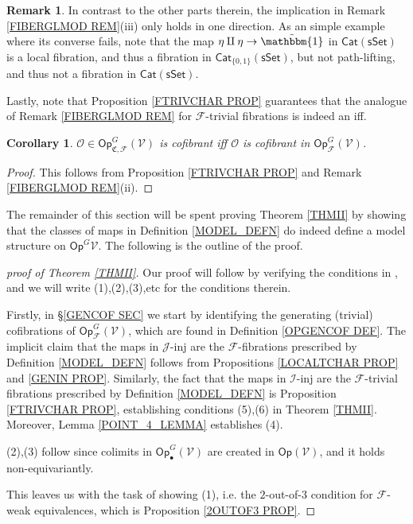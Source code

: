 \documentclass[a4paper,10pt
,draft
]{article}%
\numberwithin{equation}{section}
\numberwithin{figure}{section}
\newtheorem{corollary}[equation]{Corollary}%
\theoremstyle{definition} %
\newtheorem{remark}[equation]{Remark}%
\newcommand{\Op}{\mathsf{Op}}%
\newcommand{\F}{\ensuremath{\mathcal F}}
\newcommand{\V}{\ensuremath{\mathcal V}}
\renewcommand{\O}{\ensuremath{\mathcal O}}
\newcommand{\1}{\ensuremath{\mathbbm 1}}%
\begin{document}
\begin{remark}
In contrast to the other parts therein,
the implication in Remark \ref{FIBERGLMOD REM}(iii) 
only holds in one direction. 
As an simple example where its converse fails, 
note that the map $\eta \amalg \eta \to \tilde{\mathbbm{1}}$
in $\mathsf{Cat}(\mathsf{sSet})$ is a local fibration, 
and thus a fibration in $\mathsf{Cat}_{\{0,1\}}(\mathsf{sSet})$,
but not path-lifting, and thus not a fibration in $\mathsf{Cat}(\mathsf{sSet})$.

Lastly, note that Proposition \ref{FTRIVCHAR PROP}
guarantees that the analogue of Remark \ref{FIBERGLMOD REM}
for $\F$-trivial fibrations is indeed an iff.
\end{remark}

\begin{corollary}
      $\O \in \Op^G_{\mathfrak C, \F}(\V)$ is cofibrant iff $\O$ is cofibrant in $\Op^G_{\F}(\V)$.
\end{corollary}
\begin{proof}
      This follows from Proposition \ref{FTRIVCHAR PROP} and Remark \ref{FIBERGLMOD REM}(ii).
\end{proof}

The remainder of this section will be spent proving Theorem \ref{THMII}
by showing that the classes of maps in Definition \ref{MODEL_DEFN}
do indeed define a model structure on $\mathsf{Op}^G{\V}$.
The following is the outline of the proof.

\begin{proof}[proof of Theorem \ref{THMII}]
Our proof will follow by verifying the conditions in 
\cite[Theorem 2.1.19]{Hov}, and we will write (1),(2),(3),etc for the conditions therein.

Firstly, in \S \ref{GENCOF SEC} we start by identifying
the generating (trivial) cofibrations of $\mathsf{Op}^G_{\F}(\V)$,
which are found in Definition \ref{OPGENCOF DEF}.
The implicit claim that the maps
in $\mathcal{J}$-inj are the $\F$-fibrations prescribed by 
Definition \ref{MODEL_DEFN}
follows from Propositions \ref{LOCALTCHAR PROP} and \ref{GENIN PROP}.
Similarly, the fact that the maps in $\mathcal{I}$-inj are the 
$\F$-trivial fibrations prescribed by 
Definition \ref{MODEL_DEFN}
is Proposition \ref{FTRIVCHAR PROP}, 
establishing conditions (5),(6) in Theorem \ref{THMII}.
Moreover, Lemma \ref{POINT_4_LEMMA} establishes (4).

(2),(3) follow since colimits in $\mathsf{Op}^G_\bullet(\V)$ are created in $\Op(\V)$, and it holds non-equivariantly.

This leaves us with the task of showing (1), i.e. the $2$-out-of-$3$ condition for $\F$-weak equivalences, 
which is Proposition \ref{2OUTOF3 PROP}.
\end{proof}
\end{document}
